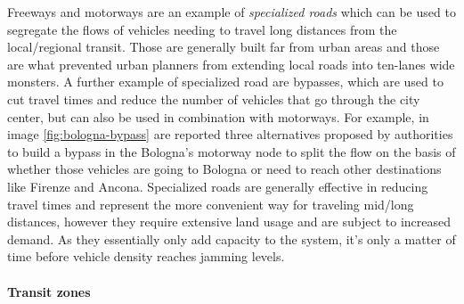 Freeways and motorways are an example of \textit{specialized roads} which can be used to segregate the flows of vehicles needing to travel long distances from the local/regional transit. Those are generally built far from urban areas and those are what prevented urban planners from extending local roads into ten-lanes wide monsters. A further example of specialized road are bypasses, which are used to cut travel times and reduce the number of vehicles that go through the city center, but can also be used in combination with motorways. For example, in image \ref{fig:bologna-bypass} are reported three alternatives proposed by authorities to build a bypass in the Bologna's motorway node to split the flow on the basis of whether those vehicles are going to Bologna or need to reach other destinations like Firenze and Ancona. Specialized roads are generally effective in reducing travel times and represent the more convenient way for traveling mid/long distances, however they require extensive land usage and are subject to increased demand. As they essentially only add capacity to the system, it's only a matter of time before vehicle density reaches jamming levels.


\paragraph{Transit zones}

